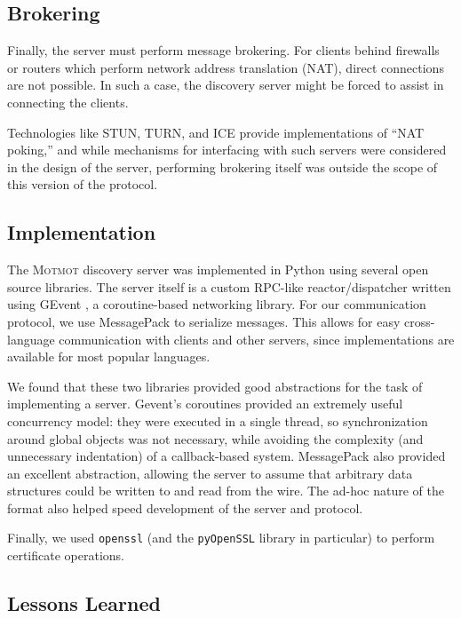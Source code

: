 \documentclass{sig-alternate}
\newcommand\Motmot{\textsc{Motmot}\xspace}
\begin{document}
\subsection{Brokering}

Finally, the server must perform message brokering. For clients behind firewalls
or routers which perform network address translation (NAT), direct connections
are not possible. In such a case, the discovery server might be forced to assist
in connecting the clients.

Technologies like STUN, TURN, and ICE provide implementations of ``NAT poking,''
and while mechanisms for interfacing with such servers were considered in the
design of the server, performing brokering itself was outside the scope of this
version of the protocol.

\subsection{Implementation}

The \Motmot discovery server was implemented in Python using several open source
libraries. The server itself is a custom RPC-like reactor/dispatcher written
using GEvent \cite{glib}, a coroutine-based networking library. For our
communication protocol, we use MessagePack \cite{msgpack} to serialize messages.
This allows for easy cross-language communication with clients and other servers,
since implementations are available for most popular languages.

We found that these two libraries provided good abstractions for the task of
implementing a server. Gevent's coroutines provided an extremely useful
concurrency model: they were executed in a single thread, so synchronization
around global objects was not necessary, while avoiding the complexity (and
unnecessary indentation) of a callback-based system. MessagePack also provided
an excellent abstraction, allowing the server to assume that arbitrary data
structures could be written to and read from the wire. The ad-hoc nature of the
format also helped speed development of the server and protocol.

Finally, we used \texttt{openssl} (and the \texttt{pyOpenSSL} library in
particular) to perform certificate operations.

\subsection{Lessons Learned}
\end{document}
